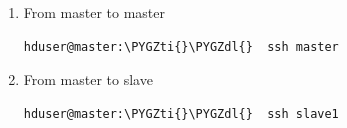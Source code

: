 \documentclass[a4paper,12pt,oneside]{sphinxmanual}
\def\PYGZdl{\char`\$}
\def\PYGZti{\char`\~}
\begin{document}
\begin{enumerate}
\item {} 
From master to master

\begin{Verbatim}[commandchars=\\\{\}]
hduser@master:\PYGZti{}\PYGZdl{}  ssh master
\end{Verbatim}

\end{enumerate}
\begin{figure}[htbp]
\centering

\end{figure}
\begin{enumerate}
\setcounter{enumi}{1}
\item {} 
From master to slave

\begin{Verbatim}[commandchars=\\\{\}]
hduser@master:\PYGZti{}\PYGZdl{}  ssh slave1
\end{Verbatim}

\end{enumerate}
\begin{figure}[htbp]
\centering

\end{figure}
\end{document}
